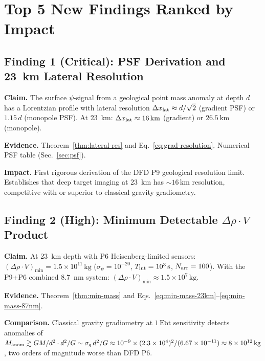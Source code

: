\documentclass[aps,prd,twocolumn,superscriptaddress,nofootinbib]{revtex4-2}
\newcommand{\drho}{\Delta\rho}
\newcommand{\km}{\,\mathrm{km}}
\begin{document}
\section{Top 5 New Findings Ranked by Impact}
\label{sec:findings}

\subsection*{Finding 1 (Critical): PSF Derivation and 23~km Lateral Resolution}

\textbf{Claim.} The surface $\psi$-signal from a geological point mass
anomaly at depth $d$ has a Lorentzian profile with lateral resolution
$\Delta x_{\rm lat} \approx d/\sqrt{2}$ (gradient PSF) or $1.15\,d$
(monopole PSF).  At 23~km: $\Delta x_{\rm lat} \approx 16\km$ (gradient)
or $26.5\km$ (monopole).

\textbf{Evidence.} Theorem~\ref{thm:lateral-res} and
Eq.~\eqref{eq:grad-resolution}.  Numerical PSF table (Sec.~\ref{sec:psf}).

\textbf{Impact.} First rigorous derivation of the DFD P9 geological
resolution limit.  Establishes that deep target imaging at 23~km
has $\sim 16\km$ resolution, competitive with or superior to
classical gravity gradiometry.

\subsection*{Finding 2 (High): Minimum Detectable $\drho \cdot V$ Product}

\textbf{Claim.} At 23~km depth with P6 Heisenberg-limited sensors:
$(\drho \cdot V)_{\min} = 1.5\times10^{11}\,\mathrm{kg}$
($\sigma_\psi = 10^{-20}$, $T_{\rm int} = 10^3\,\mathrm{s}$,
$N_{\rm arr} = 100$).
With the P9+P6 combined 8.7~nm system: $(\drho\cdot V)_{\min}
\approx 1.5\times10^7\,\mathrm{kg}$.

\textbf{Evidence.} Theorem~\ref{thm:min-mass} and
Eqs.~\eqref{eq:min-mass-23km}--\eqref{eq:min-mass-87nm}.

\textbf{Comparison.} Classical gravity gradiometry at
$1\,\mathrm{E\ddot{o}t}$ sensitivity detects anomalies of
$M_{\rm anom} \gtrsim GM/d^2 \cdot d^2/G \sim \sigma_g\,d^2/G
\approx 10^{-9}\times(2.3\times10^4)^2/(6.67\times10^{-11})
\approx 8\times10^{12}\,\mathrm{kg}$,
two orders of magnitude worse than DFD P6.
\end{document}
